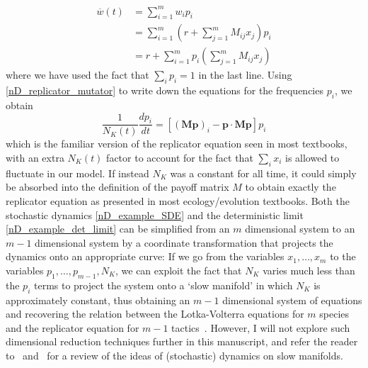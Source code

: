 \begin{align}
\overline{w}(t) &= \sum\limits_{i=1}^{m}w_ip_i\\
&= \sum\limits_{i=1}^{m}\left(r + \sum\limits_{j=1}^{m}M_{ij}x_j\right)p_i\\
&= r + \sum\limits_{i=1}^{m}p_i\left(\sum\limits_{j=1}^{m}M_{ij}x_j\right)
\end{align}
where we have used the fact that $\sum_i p_i = 1$ in the last line. Using \eqref{nD_replicator_mutator} to write down the equations for the frequencies $p_i$, we obtain
\begin{equation}
\frac{1}{N_K(t)}\frac{dp_i}{dt} = \left[(\mathbf{Mp})_i - \mathbf{p}\cdot\mathbf{Mp}\right]p_i   
\end{equation}
which is the familiar version of the replicator equation seen in most textbooks, with an extra $N_K(t)$ factor to account for the fact that $\sum_i x_i$ is allowed to fluctuate in our model. If instead $N_K$ was a constant for all time, it could simply be absorbed into the definition of the payoff matrix $M$ to obtain exactly the replicator equation as presented in most ecology/evolution textbooks. Both the stochastic dynamics \eqref{nD_example_SDE} and the deterministic limit \eqref{nD_example_det_limit} can be simplified from an $m$ dimensional system to an $m-1$ dimensional system by a coordinate transformation that projects the dynamics onto an appropriate curve: If we go from the variables $x_1,\ldots,x_m$ to the variables $p_1,\ldots,p_{m-1},N_K$, we can exploit the fact that $N_K$ varies much less than the $p_i$ terms to project the system onto a `slow manifold' in which $N_K$ is approximately constant, thus obtaining an $m-1$ dimensional system of equations and recovering the relation between the Lotka-Volterra equations for $m$ species and the replicator equation for $m-1$ tactics~\citep{constable_mapping_2017,parsons_dimension_2017}. However, I will not explore such dimensional reduction techniques further in this manuscript, and refer the reader to~\cite{constable_stochastic_2013} and~\cite{parsons_dimension_2017} for a review of the ideas of (stochastic) dynamics on slow manifolds.

